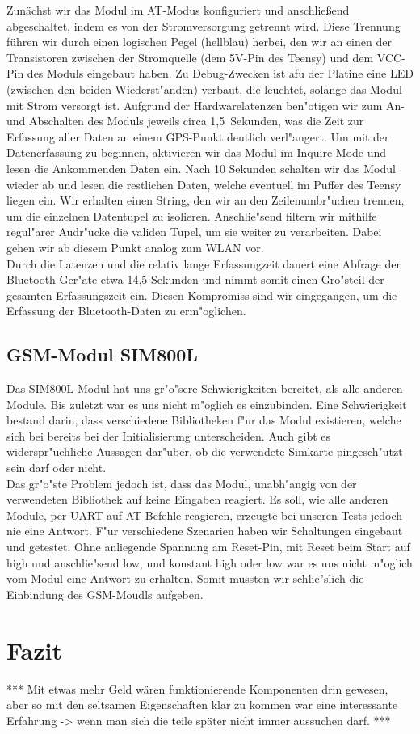\documentclass[a4paper,11pt, ngerman]{scrartcl}
\begin{document}
Zunächst wir das Modul im AT-Modus konfiguriert und anschließend abgeschaltet, indem es von der Stromversorgung getrennt wird. Diese Trennung führen wir durch einen logischen Pegel (hellblau) herbei, den wir an einen der Transistoren zwischen der Stromquelle (dem 5V-Pin des Teensy) und dem VCC-Pin des Moduls eingebaut haben. Zu Debug-Zwecken ist afu der Platine eine LED (zwischen den beiden Wiederst"anden) verbaut, die leuchtet, solange das Modul mit Strom versorgt ist. Aufgrund der Hardwarelatenzen ben"otigen wir zum An- und Abschalten des Moduls jeweils circa 1,5~Sekunden, was die Zeit zur Erfassung aller Daten an einem GPS-Punkt deutlich verl"angert. Um mit der Datenerfassung zu beginnen, aktivieren wir das Modul im Inquire-Mode und lesen die Ankommenden Daten ein. Nach 10 Sekunden schalten wir das Modul wieder ab und lesen die restlichen Daten, welche eventuell im Puffer des Teensy liegen ein. Wir erhalten einen String, den wir an den Zeilenumbr"uchen trennen, um die einzelnen Datentupel zu isolieren. Anschlie"send filtern wir mithilfe regul"arer Audr"ucke die validen Tupel, um sie weiter zu verarbeiten. Dabei gehen wir ab diesem Punkt analog zum WLAN vor.\\
Durch die Latenzen und die relativ lange Erfassungzeit dauert eine Abfrage der Bluetooth-Ger"ate etwa 14,5 Sekunden und nimmt somit einen Gro"steil der gesamten Erfassungszeit ein. Diesen Kompromiss sind wir eingegangen, um die Erfassung der Bluetooth-Daten zu erm"oglichen.
\subsection{GSM-Modul SIM800L}
Das SIM800L-Modul hat uns gr"o"sere Schwierigkeiten bereitet, als alle anderen Module. Bis zuletzt war es uns nicht m"oglich es einzubinden. Eine Schwierigkeit bestand darin, dass verschiedene Bibliotheken f"ur das Modul existieren, welche sich bei bereits bei der Initialisierung unterscheiden. Auch gibt es widerspr"uchliche Aussagen dar"uber, ob die verwendete Simkarte pingesch"utzt sein darf oder nicht.\\
Das gr"o"ste Problem jedoch ist, dass das Modul, unabh"angig von der verwendeten Bibliothek auf keine Eingaben reagiert. Es soll, wie alle anderen Module, per UART auf AT-Befehle reagieren, erzeugte bei unseren Tests jedoch nie eine Antwort. 
F"ur verschiedene Szenarien haben wir Schaltungen eingebaut und getestet. Ohne anliegende Spannung am Reset-Pin, mit Reset beim Start auf high und anschlie"send low, und konstant high oder low war es uns nicht m"oglich vom Modul eine Antwort zu erhalten. Somit mussten wir schlie"slich die Einbindung des GSM-Moudls aufgeben.
\section{Fazit}
*** Mit etwas mehr Geld wären funktionierende Komponenten drin gewesen, aber so mit den seltsamen Eigenschaften klar zu kommen war eine interessante Erfahrung -> wenn man sich die teile später nicht immer aussuchen darf. ***
\nocite{*}
\end{document}
